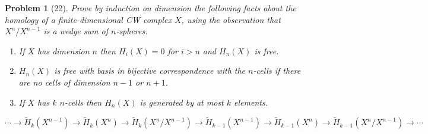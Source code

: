 \documentclass[10pt]{article}
\newcommand{\wt}[1]{\widetilde{#1}}
\theoremstyle{plain}
\newtheorem{problem}{Problem}
\theoremstyle{remark}
\begin{document}
\begin{problem}[22]
  Prove by induction on dimension the following facts about the
  homology of a finite-dimensional CW complex $X$, using the observation
  that $X^n/X^{n-1}$ is a wedge sum of $n$-spheres.
  \begin{enumerate}
  \item[(a)] If $X$ has dimension $n$ then $H_i(X)=0$ for $i>n$ and
    $H_n(X)$ is free.
  \item[(b)] $H_n(X)$ is free with basis in bijective correspondence
    with the $n$-cells if there are no cells of dimension $n-1$ or $n+1$.
  \item[(c)]  If $X$ has $k$ $n$-cells then $H_n(X)$ is generated by
    at most $k$ elements.
  \end{enumerate}
\end{problem}

\[
  \cdots \rightarrow \wt{H}_k(X^{n-1})\rightarrow \wt{H}_k(X^n) \rightarrow \wt{H}_k(X^n/X^{n-1}) \rightarrow \wt{H}_{k-1}(X^{n-1}) \rightarrow \wt{H}_{k-1}(X^n) \rightarrow \wt{H}_{k-1}(X^n/X^{n-1}) \rightarrow \cdots
\]
\end{document}
